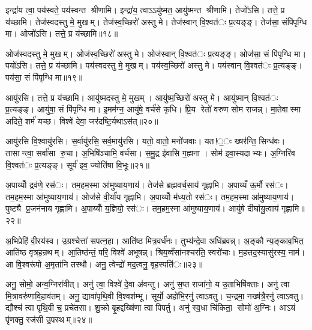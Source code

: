 इन्द्रा॑य त्वा॒ पय॑स्वते॒ पय॑स्वन्त श्रीणामि। इन्द्रा॑य॒ त्वाऽऽयु॑ष्मत॒ आयु॑ष्मन्त श्रीणामि। तेजो॑ऽसि। तत्ते॒ प्र य॑च्छामि। तेज॑स्वदस्तु मे॒ मुखम्। तेज॑स्व॒च्छिरो॑ अस्तु मे। तेज॑स्वान् वि॒श्वत॑ः प्र॒त्यङ्ङ्। तेज॑सा॒ संपि॑पृग्धि मा। ओजो॑ऽसि। तत्ते॒ प्र य॑च्छामि॥१८॥

ओज॑स्वदस्तु मे॒ मुखम्। ओज॑स्व॒च्छिरो॑ अस्तु मे। ओज॑स्वान् वि॒श्वत॑ः प्र॒त्यङ्ङ्। ओज॑सा॒ सं पि॑पृग्धि मा। पयो॑ऽसि। तत्ते॒ प्र य॑च्छामि। पय॑स्वदस्तु मे॒ मुखम्। पय॑स्व॒च्छिरो॑ अस्तु मे। पय॑स्वान् वि॒श्वत॑ः प्र॒त्यङ्ङ्। पय॑सा॒ सं पि॑पृग्धि मा॥१९॥

आयु॑रसि। तत्ते॒ प्र य॑च्छामि। आयु॑ष्मदस्तु मे॒ मुखम्। आयु॑ष्म॒च्छिरो॑ अस्तु मे। आयु॑ष्मान् वि॒श्वत॑ः प्र॒त्यङ्ङ्। आयु॑षा॒ सं पि॑पृग्धि मा। इ॒मम॑ग्न॒ आयु॑षे॒ वर्च॑से कृधि। प्रि॒य रेतो॑ वरुण सोम राजन्न्। मा॒तेवास्मा अदिते॒ शर्म॑ यच्छ। विश्वे॑ देवा॒ जर॑दष्टि॒र्यथाऽस॑त्॥२०॥

आयु॑रसि वि॒श्वायु॑रसि। स॒र्वायु॑रसि॒ सर्व॒मायु॑रसि। यतो॒ वातो॒ मनो॑जवाः। यत!॒ः ख्षर॑न्ति॒ सिन्ध॑वः। तासान्त्वा॒ सर्वा॑सा रु॒चा। अ॒भिषि॑ञ्चामि॒ वर्च॑सा। स॒मु॒द्र इ॑वासि ग॒ह्मना। सोम॑ इवा॒स्यदाभ्यः। अ॒ग्निरि॑व वि॒श्वत॑ः प्र॒त्यङ्ङ्। सूर्य॑ इव॒ ज्योति॑षा वि॒भूः॥२१॥

अ॒पाय्योँ द्रव॑णे॒ रस॑ः। तम॒हम॒स्मा आ॑मुष्याय॒णाय॑। तेज॑से ब्रह्मवर्च॒साय॑ गृह्णामि। अ॒पाय्यँ ऊ॒र्मौ रस॑ः। तम॒हम॒स्मा आ॑मुष्याय॒णाय॑। ओज॑से वी॒र्या॑य गृह्णामि। अ॒पाय्योँ म॑ध्य॒तो रस॑ः। तम॒हम॒स्मा आ॑मुष्याय॒णाय॑। पुष्ट्यै प्र॒जन॑नाय गृह्णामि। अ॒पाय्योँ य॒ज्ञियो॒ रस॑ः। तम॒हम॒स्मा आ॑मुष्याय॒णाय॑। आयु॑षे दीर्घायु॒त्वाय॑ गृह्णामि॥२२॥


अ॒भिप्रेहि॑ वी॒रय॑स्व। उ॒ग्रश्चेत्ता॑ सपत्न॒हा। आति॑ष्ठ मित्र॒वर्ध॑नः। तुभ्य॑न्दे॒वा अधि॑ब्रवन्न्। अ॒ङ्कौ न्य॒ङ्काव॒भित॒ आति॑ष्ठ वृत्रह॒न्रथम्। आ॒तिष्ठ॑न्तं॒ परि॒ विश्वे॑ अभूषन्न्। श्रिय॒व्वँसा॑नश्चरति॒ स्वरो॑चाः। म॒हत्तद॒स्यासु॑रस्य॒ नाम॑। आ वि॒श्वरू॑पो अ॒मृता॑नि तस्थौ। अनु॒ त्वेन्द्रो॑ मद॒त्वनु॒ बृह॒स्पति॑ः॥२३॥

अनु॒ सोमो॒ अन्व॒ग्निरा॑वीत्। अनु॑ त्वा॒ विश्वे॑ दे॒वा अ॑वन्तु। अनु॑ स॒प्त राजा॑नो॒ य उ॒ताभिषि॑क्ताः। अनु॑ त्वा मि॒त्रावरु॑णावि॒हाव॑तम्। अनु॒ द्यावा॑पृथि॒वी वि॒श्वश॑म्भू। सूर्यो॒ अहो॑भि॒रनु॑ त्वाऽवतु। च॒न्द्रमा॒ नख्ष॑त्रै॒रनु॑ त्वाऽवतु। द्यौश्च॑ त्वा पृथि॒वी च॒ प्रचे॑तसा। शु॒क्रो बृ॒हद्दख्षि॑णा त्वा पिपर्तु। अनु॑ स्व॒धा चि॑किता॒ सोमो॑ अ॒ग्निः। आऽयं पृ॑णक्तु॒ रज॑सी उ॒पस्थम्॥२४॥



